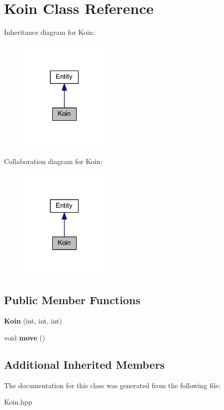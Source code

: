 \hypertarget{class_koin}{}\section{Koin Class Reference}
\label{class_koin}


Inheritance diagram for Koin\+:
\nopagebreak
\begin{figure}[H]
\begin{center}
\leavevmode
\includegraphics[width=122pt]{class_koin__inherit__graph}
\end{center}
\end{figure}


Collaboration diagram for Koin\+:
\nopagebreak
\begin{figure}[H]
\begin{center}
\leavevmode
\includegraphics[width=122pt]{class_koin__coll__graph}
\end{center}
\end{figure}
\subsection*{Public Member Functions}
\begin{DoxyCompactItemize}
\item 
\mbox{\label{class_koin_a68434ca0d1c219f1863e9d43bc9a0be4}} 
{\bfseries Koin} (int, int, int)
\item 
\mbox{\label{class_koin_a086d48dfd240ab4a139e0c97e8b7fb04}} 
void {\bfseries move} ()
\end{DoxyCompactItemize}
\subsection*{Additional Inherited Members}


The documentation for this class was generated from the following file\+:\begin{DoxyCompactItemize}
\item 
Koin.\+hpp\end{DoxyCompactItemize}
